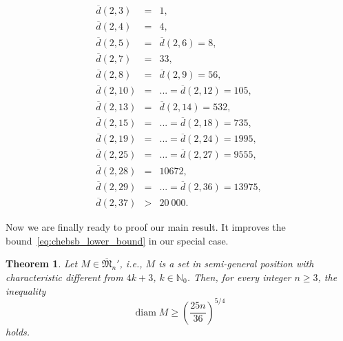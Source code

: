 \documentclass[a4paper,14pt]{article} %
\theoremstyle{plain}
\newtheorem{theorem}{Theorem}[section]
\theoremstyle{definition}
\begin{document}
\begin{eqnarray}
\label{d}
\overline{d}(2,3)&=& 1,{}\nonumber\\
\overline{d}(2,4)&=& 4,{}\nonumber\\
\overline{d}(2,5)&=&  \overline{d}(2,6)= 8,{}\nonumber\\
\overline{d}(2,7)&=& 33,{}\nonumber\\
\overline{d}(2,8)&=&  \overline{d}(2,9)= 56,{}\nonumber\\
\overline{d}(2,10)&=& ... =\overline{d}(2,12)= 105,{}\nonumber\\
\overline{d}(2,13)&=&  \overline{d}(2,14)= 532,{}\nonumber\\
\overline{d}(2,15)&=&  ... = \overline{d}(2,18) = 735,{}\nonumber\\
\overline{d}(2,19)&=& ... = \overline{d}(2,24) = 1995,{}\nonumber\\
\overline{d}(2,25)&=&  ... = \overline{d}(2,27)= 9555,{}\nonumber\\
\overline{d}(2,28)&=& 10672,{}\nonumber\\
\overline{d}(2,29)&=&  ... = \overline{d}(2,36) = 13975,{}\nonumber\\
\overline{d}(2,37) &>& 20\ 000.
\end{eqnarray}


Now we are finally ready to proof our main result.
It improves the bound~\eqref{eq:chebsb_lower_bound}
in our special case.

\begin{theorem}
	\label{thm:main_result}
	Let $M \in \overline{\mathfrak{M}}_n'$, i.e., $M$ is a set in semi-general position with characteristic different from $4k+3$, $k \in \mathbb{N}_0$.
	Then, for every integer $n \geq 3$, the inequality
	\begin{equation}
		\operatorname{diam} M \geq \left( \frac{25n}{36} \right)^{5/4}
	\end{equation}
	holds.
\end{theorem}
\end{document}
